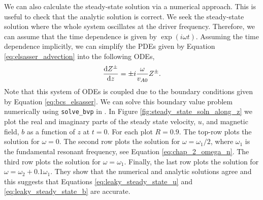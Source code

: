 We can also calculate the steady-state solution via a numerical approach. This is useful to check that the analytic solution is correct. We seek the steady-state solution where the whole system oscillates at the driver frequency. Therefore, we can assume that the time dependence is given by $\exp(i\omega t)$. Assuming the time dependence implicitly, we can simplify the PDEs given by Equation \eqref{eq:elsasser_advection} into the following ODEs,
\begin{equation}
    \label{eq:numerical_elssasser_eqn}
    \dv{Z^{\pm}}{z}=\pm i\frac{\omega}{v_{A0}}Z^{\pm}.
\end{equation}
Note that this system of ODEs is coupled due to the boundary conditions given by Equation \eqref{eq:bcs_elsasser}. We can solve this boundary value problem numerically using \texttt{solve\_bvp} in \citet{SciPy2020}. In Figure \ref{fig:steady_state_soln_along_z} we plot the real and imaginary parts of the steady state velocity, $u$, and magnetic field, $b$ as a function of $z$ at $t=0$. For each plot $R=0.9$. The top-row plots the solution for $\omega=0$. The second row plots the solution for $\omega=\omega_1/2$, where $\omega_1$ is the fundamental resonant frequency, see Equation \eqref{eq:chap_2_omega_n}. The third row plots the solution for $\omega = \omega_1$. Finally, the last row plots the solution for $\omega=\omega_2 + 0.1\omega_1$. They show that the numerical and analytic solutions agree and this suggests that Equations \eqref{eq:leaky_steady_state_u} and \eqref{eq:leaky_steady_state_b} are accurate.

